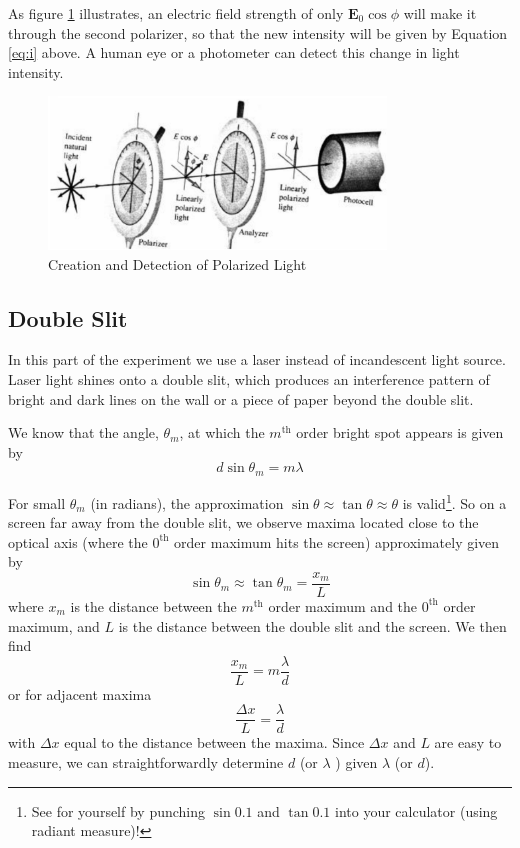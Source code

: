 As figure {\ref{fig:polarized}} illustrates, an electric field strength of only $\mathbf{E}_{0}\cos\phi$ will make it through the second polarizer, so that the new intensity will be given by Equation {\ref{eq:i}} above. A human eye or a photometer can detect this change in light intensity.
\begin{figure}[h]
\centering
\includegraphics[width=0.8\textwidth]{./Exp8/pic/image7.png}
\caption{Creation and Detection of Polarized Light}
\label{fig:polarized}
\end{figure} 

\subsection{Double Slit}
In this part of the experiment we use a laser instead of incandescent light source. Laser light shines onto a double slit, which produces an interference pattern of bright and dark lines on the wall or a piece of paper beyond the double slit. \myskip

We know that the angle, $\theta_{m}$, at which the $m^{\mathrm{th}}$ order bright spot appears is given by
\begin{equation}
  d\sin\theta_{m}=m\lambda
\end{equation}

For small $\theta_{m}$ (in radians), the approximation $\sin\theta \approx \tan\theta \approx \theta$ is valid\footnote{See for yourself by punching $\sin 0.1$ and $\tan 0.1$ into your calculator (using radiant measure)!}. So on a screen far away from the double slit, we observe maxima located close to the optical axis (where the $0^{\mathrm{th}}$ order maximum hits the screen) approximately given by
\begin{equation}
\sin\theta_{m}\approx\tan\theta_{m}=\frac{x_{m}}{L}
\end{equation}
where $x_m$ is the distance between the $m^{\mathrm{th}}$ order maximum and the $0^{\mathrm{th}}$ order maximum, and $L$ is the distance between the double slit and the screen. We then find
\begin{equation}
\frac{x_{m}}{L}=m\frac{\lambda}{d}
\end{equation}
or for adjacent maxima
\begin{equation}
  \frac{\Delta x}{L}=\frac{\lambda}{d}
\end{equation}
with $\Delta x$ equal to the distance between the maxima. Since $\Delta x$ and $L$ are easy to measure, we can straightforwardly determine $d$ (or $\lambda$ ) given $\lambda$ (or $d$).

